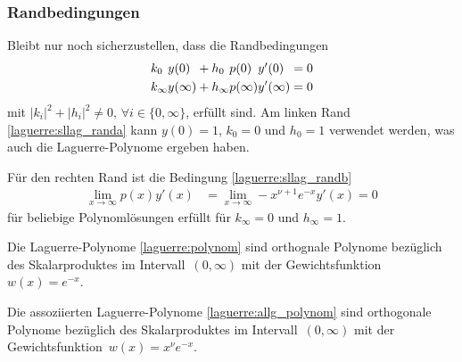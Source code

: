\subsubsection{Randbedingungen}
Bleibt nur noch sicherzustellen, dass die Randbedingungen
\begin{align}
\rlap{$k_0$}\phantom{k_\infty}\rlap{$y(0)$}\phantom{y(\infty)}
+
\rlap{$h_0$}\phantom{h_\infty} \rlap{$p(0)$}\phantom{p(\infty)}\rlap{$y'(0)$}\phantom{y'(\infty)}
 & =
0
\label{laguerre:sllag_randa}
\\
k_\infty y(\infty) + h_\infty p(\infty) y'(\infty)
 & =
0
\label{laguerre:sllag_randb}
\end{align}
mit $|k_i|^2 + |h_i|^2 \neq 0,\,\forall i \in \{0, \infty\}$, erfüllt sind.
%
Am linken Rand \eqref{laguerre:sllag_randa} kann $y(0) = 1$, $k_0 = 0$ und
$h_0 = 1$ verwendet werden,
was auch die Laguerre-Polynome ergeben haben.

Für den rechten Rand ist die Bedingung \eqref{laguerre:sllag_randb}
\begin{align*}
\lim_{x \rightarrow \infty} p(x) y'(x)
 & =
\lim_{x \rightarrow \infty} -x^{\nu + 1} e^{-x} y'(x)
=
0
\end{align*}
für beliebige Polynomlösungen erfüllt für $k_\infty=0$ und $h_\infty=1$.

\begin{satz}
Die Laguerre-Polynome %
\eqref{laguerre:polynom}
sind orthognale Polynome bezüglich des Skalarproduktes
im Intervall~$(0, \infty)$ mit der Gewichts\-funktion~$w(x)=e^{-x}$.
\end{satz}

\begin{satz}
Die assoziierten Laguerre-Polynome \eqref{laguerre:allg_polynom}
sind orthogonale Polynome bezüglich des Skalarproduktes 
im Intervall~$(0, \infty)$ mit der Gewichts\-funktion~$w(x)=x^\nu e^{-x}$.
\end{satz}
